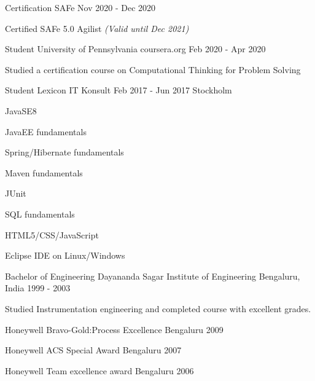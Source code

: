 \documentclass[11pt, a4paper]{awesome-cv}
\begin{document}
  \begin{cventries}
    \cventry
    {Certification}
      {SAFe}
      {Nov 2020 - Dec 2020}
      {}
      {
        \begin{cvitems}
        \item {Certified SAFe 5.0 Agilist \textit{(Valid until Dec 2021)}}
        \end{cvitems}
      }

    \cventry
      {Student}
      {University of Pennsylvania}
      {coursera.org}
      {Feb 2020 - Apr 2020}
      {
        \begin{cvitems}
        \item {Studied a certification course on Computational Thinking for Problem Solving}
        \end{cvitems}
      }

    \cventry
      {Student}
      {Lexicon IT Konsult}
      {Feb 2017 - Jun 2017}
      {Stockholm}
      {
        \begin{cvitems}
          \item JavaSE8
          \item JavaEE fundamentals
          \item Spring/Hibernate fundamentals
          \item Maven fundamentals
          \item JUnit
          \item SQL fundamentals
          \item HTML5/CSS/JavaScript
          \item Eclipse IDE on Linux/Windows
           \end{cvitems}
      }

    \cventry
      {Bachelor of Engineering}
      {Dayananda Sagar Institute of Engineering}
      {Bengaluru, India}
      {1999 - 2003}
      {
        \begin{cvitems}
        \item {Studied Instrumentation engineering and completed course with excellent grades.}
        \end{cvitems}
      }
  \end{cventries}

  \begin{cvhonors}

      \cvhonor
      {Honeywell}
      {Bravo-Gold:Process Excellence}
      {Bengaluru}
      {2009}

      \cvhonor
      {Honeywell}
      {ACS Special Award}
      {Bengaluru}
      {2007}

      \cvhonor
      {Honeywell}
      {Team excellence award}
      {Bengaluru}
      {2006}
  \end{cvhonors}
\end{document}
